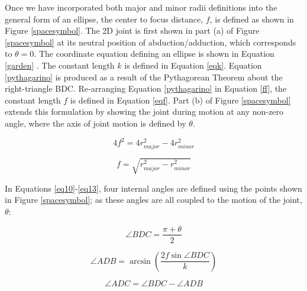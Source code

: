 \documentclass[journal]{IEEEtran}
\begin{document}
Once we have incorporated both major and minor radii definitions into the general form of an ellipse, the center to focus distance, $f$, is defined as shown in Figure \ref{spacesymbol}. The 2D joint is first shown in part (a) of Figure \ref{spacesymbol} at its neutral position of abduction/adduction, which corresponds to $\theta = 0$. The coordinate equation defining an ellipse is shown in Equation \ref{garden} \cite{wolf}. The constant length $k$ is defined in Equation \ref{eqk}. Equation \ref{pythagarino} is produced as a result of the Pythagorean Theorem about the right-triangle BDC. Re-arranging Equation \ref{pythagarino} in Equation \ref{ff}, the constant length $f$ is defined in Equation \ref{eqf}. Part (b) of Figure \ref{spacesymbol} extends this formulation by showing the joint during motion at any non-zero angle, where the axis of joint motion is defined by $\theta$. 

\begin{equation} 
4 f^{2} = 4 r_{major}^{2} - 4 r_{minor}^{2} 
\label{ff}
\end{equation}

\begin{equation} 
f = \sqrt{r_{major}^{2}-r_{minor}^{2}}
\label{eqf}
\end{equation}

In Equations \ref{eq10}-\ref{eq13}, four internal angles are defined using the points shown in Figure \ref{spacesymbol}; as these angles are all coupled to the motion of the joint, $\theta{}$:

\begin{equation} 
\angle BDC = \frac{\pi + \theta}{2}
\label{eq10}
\end{equation}

\begin{equation} 
\angle ADB = \arcsin (\frac{2 f \sin \angle BDC}{k})
\label{eq11}
\end{equation}

\begin{equation} 
\angle ADC = \angle BDC - \angle ADB
\label{eq12}
\end{equation}
\end{document}
